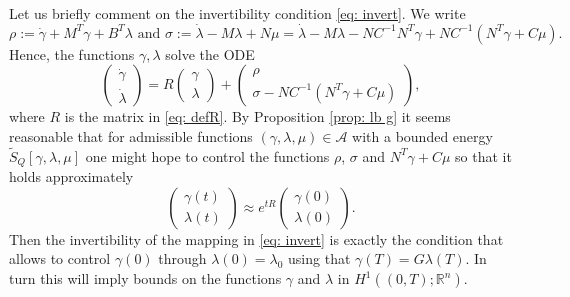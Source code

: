 \documentclass[10pt,a4paper]{amsart}
\newcommand{\R}{\mathbb R}
\begin{document}
\begin{remark}
    Let us briefly comment on the invertibility condition \eqref{eq: invert}. We write 
    \[
    \rho := \dot{\gamma} + M^T \gamma + B^T \lambda \text{ and } \sigma := \dot{\lambda} - M \lambda + N\mu = \dot{\lambda} - M \lambda - N C^{-1} N^T\gamma + NC^{-1} ( N^T \gamma + C \mu).
    \]
    Hence, the functions $\gamma, \lambda$ solve the ODE
    \[
    \begin{pmatrix}
        \dot{\gamma} \\ \dot{\lambda}
    \end{pmatrix} = R \begin{pmatrix}
        \gamma \\ \lambda
    \end{pmatrix} + \begin{pmatrix}
        \rho \\ \sigma - NC^{-1}(N^T \gamma + C \mu)
    \end{pmatrix},
    \]
    where $R$ is the matrix in \eqref{eq: defR}. 
    By Proposition \ref{prop: lb g} it seems reasonable that for admissible functions $(\gamma,\lambda,\mu) \in \mathcal{A}$ with a bounded energy $\tilde{S}_Q[\gamma,\lambda,\mu]$ one might hope to control the functions $\rho$, $\sigma$ and $N^T \gamma + C \mu$ so that it holds approximately
    \[
    \begin{pmatrix}
        \gamma(t) \\ \lambda(t)
    \end{pmatrix} \approx e^{tR} \begin{pmatrix}
        \gamma(0) \\ \lambda(0)
    \end{pmatrix}.
    \]
    Then the invertibility of the mapping in \eqref{eq: invert} is exactly the condition that allows to control $\gamma(0)$ through $\lambda(0) = \lambda_0$ using that $\gamma(T) = G \lambda(T)$. In turn this will imply bounds on the functions $\gamma$ and $\lambda$ in $H^1((0,T);\R^n)$.
\end{remark}
\end{document}
